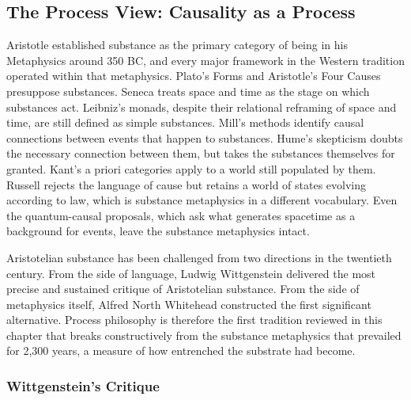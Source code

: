 \subsection{The Process View: Causality as a Process}
\label{sec:philosophy_process}

Aristotle established substance as the primary category of being in his Metaphysics around 350 BC, and every major framework in the Western tradition operated within that metaphysics. Plato's Forms and Aristotle's Four Causes presuppose substances. Seneca treats space and time as the stage on which substances act. Leibniz's monads, despite their relational reframing of space and time, are still defined as simple substances. Mill's methods identify causal connections between events that happen to substances. Hume's skepticism doubts the necessary connection between them, but takes the substances themselves for granted. Kant's a priori categories apply to a world still populated by them. Russell rejects the language of cause but retains a world of states evolving according to law, which is substance metaphysics in a different vocabulary. Even the quantum-causal proposals, which ask what generates spacetime as a background for events, leave the substance metaphysics intact. 

Aristotelian substance has been challenged from two directions in the twentieth century. From the side of language, Ludwig Wittgenstein delivered the most precise and sustained critique of Aristotelian substance. From the side of metaphysics itself, Alfred North Whitehead constructed the first significant alternative. Process philosophy is therefore the first tradition reviewed in this chapter that breaks constructively from the substance metaphysics that prevailed for 2,300 years, a measure of how entrenched the substrate had become.

\subsubsection{Wittgenstein's Critique}

